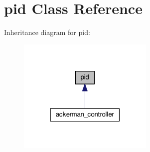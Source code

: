 \hypertarget{classpid}{}\section{pid Class Reference}
\label{classpid}


Inheritance diagram for pid\+:
\nopagebreak
\begin{figure}[H]
\begin{center}
\leavevmode
\includegraphics[width=184pt]{classpid__inherit__graph}
\end{center}
\end{figure}
